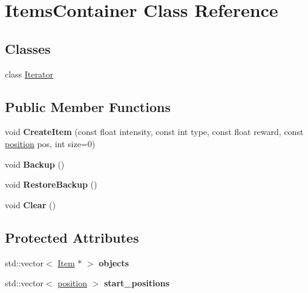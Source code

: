 \hypertarget{class_items_container}{}\section{Items\+Container Class Reference}
\label{class_items_container}
\subsection*{Classes}
\begin{DoxyCompactItemize}
\item 
class \hyperlink{class_items_container_1_1_iterator}{Iterator}
\end{DoxyCompactItemize}
\subsection*{Public Member Functions}
\begin{DoxyCompactItemize}
\item 
void {\bfseries Create\+Item} (const float intensity, const int type, const float reward, const \hyperlink{structposition}{position} pos, int size=0)\hypertarget{class_items_container_a20a17dd5ea76284f08058dcef2ed2ae1}{}\label{class_items_container_a20a17dd5ea76284f08058dcef2ed2ae1}

\item 
void {\bfseries Backup} ()\hypertarget{class_items_container_ac5fda56d21cb3dbfe3539324676d78b4}{}\label{class_items_container_ac5fda56d21cb3dbfe3539324676d78b4}

\item 
void {\bfseries Restore\+Backup} ()\hypertarget{class_items_container_ae8da03f9a1092503250d7cc3945c3110}{}\label{class_items_container_ae8da03f9a1092503250d7cc3945c3110}

\item 
void {\bfseries Clear} ()\hypertarget{class_items_container_afe3c71e5ab8edfb9cc51d0ea2046813d}{}\label{class_items_container_afe3c71e5ab8edfb9cc51d0ea2046813d}

\end{DoxyCompactItemize}
\subsection*{Protected Attributes}
\begin{DoxyCompactItemize}
\item 
std\+::vector$<$ \hyperlink{class_item}{Item} $\ast$ $>$ {\bfseries objects}\hypertarget{class_items_container_affafed4ab97909cb54474eb7cbab2847}{}\label{class_items_container_affafed4ab97909cb54474eb7cbab2847}

\item 
std\+::vector$<$ \hyperlink{structposition}{position} $>$ {\bfseries start\+\_\+positions}\hypertarget{class_items_container_a423e6fe91a727429743660295c849f1f}{}\label{class_items_container_a423e6fe91a727429743660295c849f1f}

\end{DoxyCompactItemize}
